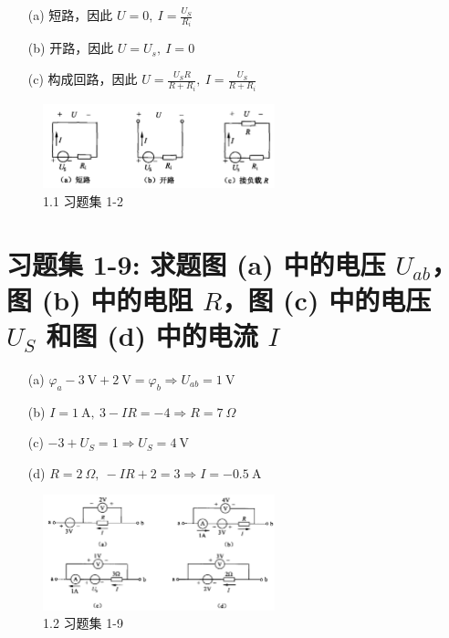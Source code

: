 \documentclass[UTF8]{report}
\theoremstyle{MyLineTheoremStyle} %
\theoremstyle{MyBlockTheoremStyle} %
\theoremstyle{MySubsubsectionStyle} %
\begin{document}
\begin{enumerate}
\item[(a)] 短路，因此 $U = 0,\  I = \frac{U_S}{R_i}$
\item[(b)] 开路，因此 $U = U_s, \ I = 0$
\item[(c)] 构成回路，因此  $ U = \frac{U_SR}{R + R_i},\ I = \frac{U_S}{R + R_i}$ 
\end{enumerate}

\begin{figure}[H]\centering
\includegraphics[width=0.6\textwidth]{assets/1/ae1cfc03fad5c98bfff08a663714a004.png}
\caption{ 1.1 习题集 1-2}
\end{figure}

\section{习题集 1-9: 求题图 (a) 中的电压 $U_{ab}$，图 (b) 中的电阻 $R$，图 (c) 中的电压 $U_S$ 和图 (d) 中的电流 $I$}

\begin{enumerate}
    \item[(a)]  $ \varphi_a - 3\ \mathrm{V} + 2\ \mathrm{V} = \varphi_b \Longrightarrow U_{ab} = 1\ \mathrm{V} $ 
    \item[(b)] $I = 1\ \mathrm{A},\  3 -IR= -4 \Longrightarrow R = 7\ \Omega$ 
    \item[(c)] $-3 + U_S = 1 \Longrightarrow U_S = 4 \ \mathrm{V}$ 
    \item[(d)] $R=2\ \Omega,\ -IR + 2 = 3 \Longrightarrow I = -0.5\ \mathrm{A}$ 
\end{enumerate}

\begin{figure}[H]\centering
    \includegraphics[width=0.6\textwidth]{assets/1/d3d69ecd6b1c1bc476fd4a4957fb9e56.png}
\caption{ 1.2 习题集 1-9}
\end{figure}
\end{document}
